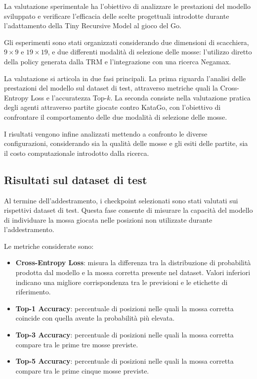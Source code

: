 La valutazione sperimentale ha l'obiettivo di analizzare le prestazioni del modello sviluppato e verificare l'efficacia delle scelte progettuali introdotte durante l'adattamento della Tiny Recursive Model al gioco del Go.

Gli esperimenti sono stati organizzati considerando due dimensioni di scacchiera, $9 \times 9$ e $19 \times 19$, e due differenti modalità di selezione delle mosse: l'utilizzo diretto della policy generata dalla TRM e l'integrazione con una ricerca Negamax.

La valutazione si articola in due fasi principali. La prima riguarda l'analisi delle prestazioni del modello sul dataset di test, attraverso metriche quali la Cross-Entropy Loss e l'accuratezza Top-$k$. La seconda consiste nella valutazione pratica degli agenti attraverso partite giocate contro KataGo, con l'obiettivo di confrontare il comportamento delle due modalità di selezione delle mosse.

I risultati vengono infine analizzati mettendo a confronto le diverse configurazioni, considerando sia la qualità delle mosse e gli esiti delle partite, sia il costo computazionale introdotto dalla ricerca.

\subsection{Risultati sul dataset di test}

Al termine dell'addestramento, i checkpoint selezionati sono stati valutati sui rispettivi dataset di test. Questa fase consente di misurare la capacità del modello di individuare la mossa giocata nelle posizioni non utilizzate durante l'addestramento.

Le metriche considerate sono:

\begin{itemize}
    \item \textbf{Cross-Entropy Loss}: misura la differenza tra la distribuzione di probabilità prodotta dal modello e la mossa corretta presente nel dataset. Valori inferiori indicano una migliore corrispondenza tra le previsioni e le etichette di riferimento.
    \item \textbf{Top-1 Accuracy}: percentuale di posizioni nelle quali la mossa corretta coincide con quella avente la probabilità più elevata.
    \item \textbf{Top-3 Accuracy}: percentuale di posizioni nelle quali la mossa corretta compare tra le prime tre mosse previste.
    \item \textbf{Top-5 Accuracy}: percentuale di posizioni nelle quali la mossa corretta compare tra le prime cinque mosse previste.
\end{itemize}


